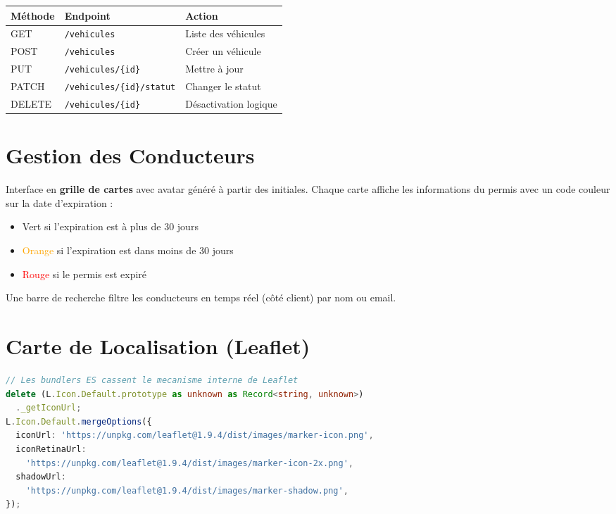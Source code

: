 \documentclass[12pt,a4paper]{report}
\begin{document}
\begin{center}
\begin{tabular}{|l|l|l|}
  \hline
  \rowcolor{lightblue}
  \textbf{Méthode} & \textbf{Endpoint} & \textbf{Action} \\
  \hline
  GET    & \texttt{/vehicules}                  & Liste des véhicules \\
  POST   & \texttt{/vehicules}                  & Créer un véhicule \\
  PUT    & \texttt{/vehicules/\{id\}}            & Mettre à jour \\
  PATCH  & \texttt{/vehicules/\{id\}/statut}     & Changer le statut \\
  DELETE & \texttt{/vehicules/\{id\}}            & Désactivation logique \\
  \hline
\end{tabular}
\end{center}

\section{Gestion des Conducteurs}

Interface en \textbf{grille de cartes} avec avatar généré à partir des initiales.
Chaque carte affiche les informations du permis avec un code couleur sur la date d'expiration :

\begin{itemize}
  \item \textcolor{green!60!black}{Vert} si l'expiration est à plus de 30 jours
  \item \textcolor{orange}{Orange} si l'expiration est dans moins de 30 jours
  \item \textcolor{red}{Rouge} si le permis est expiré
\end{itemize}

Une barre de recherche filtre les conducteurs en temps réel (côté client) par nom ou email.

\section{Carte de Localisation (Leaflet)}

\begin{lstlisting}[style=code, language=TypeScript, caption=Fix icone Leaflet avec Vite (bundler ES modules)]
// Les bundlers ES cassent le mecanisme interne de Leaflet
delete (L.Icon.Default.prototype as unknown as Record<string, unknown>)
  ._getIconUrl;
L.Icon.Default.mergeOptions({
  iconUrl: 'https://unpkg.com/leaflet@1.9.4/dist/images/marker-icon.png',
  iconRetinaUrl:
    'https://unpkg.com/leaflet@1.9.4/dist/images/marker-icon-2x.png',
  shadowUrl:
    'https://unpkg.com/leaflet@1.9.4/dist/images/marker-shadow.png',
});
\end{lstlisting}
\end{document}
